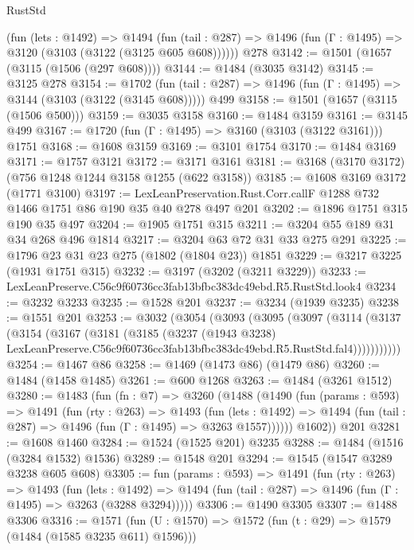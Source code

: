 \begin{lexlean}{RustStd}
\begin{coremodule}
    (fun (lets : @1492) =>
    @1494 (fun (tail : @287) => @1496 (fun (Γ : @1495) => @3120 (@3103 (@3122 (@3125 @605 @608))))))
    @278
@3142 := @1501 (@1657 (@3115 (@1506 (@297 @608))))
@3144 := @1484 (@3035 @3142)
@3145 := @3125 @278
@3154 := @1702
    (fun (tail : @287) => @1496 (fun (Γ : @1495) => @3144 (@3103 (@3122 (@3145 @608)))))
    @499
@3158 := @1501 (@1657 (@3115 (@1506 @500)))
@3159 := @3035 @3158
@3160 := @1484 @3159
@3161 := @3145 @499
@3167 := @1720 (fun (Γ : @1495) => @3160 (@3103 (@3122 @3161))) @1751
@3168 := @1608 @3159
@3169 := @3101 @1754
@3170 := @1484 @3169
@3171 := @1757 @3121
@3172 := @3171 @3161
@3181 := @3168 (@3170 @3172) (@756 @1248 @1244 @3158 @1255 (@622 @3158))
@3185 := @1608 @3169 @3172 (@1771 @3100)
@3197 := LexLeanPreservation.Rust.Corr.callF @1288 @732 @1466 @1751 @86 @190 @35 @40 @278 @497 @201
@3202 := @1896 @1751 @315 @190 @35 @497
@3204 := @1905 @1751 @315
@3211 := @3204 @55 @189 @31 @34 @268 @496 @1814
@3217 := @3204 @63 @72 @31 @33 @275 @291
@3225 := @1796 @23 @31 @23 @275 (@1802 (@1804 @23)) @1851
@3229 := @3217 @3225 (@1931 @1751 @315)
@3232 := @3197 (@3202 (@3211 @3229))
@3233 := LexLeanPreserve.C56c9f60736cc3fab13bfbc383dc49ebd.R5.RustStd.look4
@3234 := @3232 @3233
@3235 := @1528 @201
@3237 := @3234 (@1939 @3235)
@3238 := @1551 @201
@3253 := @3032
    (@3054
      (@3093
        (@3095
          (@3097
            (@3114
              (@3137
                (@3154
                  (@3167
                    (@3181
                      (@3185
                        (@3237
                          (@1943 @3238)
                          LexLeanPreserve.C56c9f60736cc3fab13bfbc383dc49ebd.R5.RustStd.fal4)))))))))))
@3254 := @1467 @86
@3258 := @1469 (@1473 @86) (@1479 @86)
@3260 := @1484 (@1458 @1485)
@3261 := @600 @1268
@3263 := @1484 (@3261 @1512)
@3280 := @1483
    (fun (fn : @7) =>
    @3260
      (@1488
        (@1490
          (fun (params : @593) =>
          @1491
            (fun (rty : @263) =>
            @1493
              (fun (lets : @1492) =>
              @1494 (fun (tail : @287) => @1496 (fun (Γ : @1495) => @3263 @1557))))))
        @1602))
    @201
@3281 := @1608 @1460
@3284 := @1524 (@1525 @201) @3235
@3288 := @1484 (@1516 (@3284 @1532) @1536)
@3289 := @1548 @201
@3294 := @1545 (@1547 @3289 @3238 @605 @608)
@3305 := fun (params : @593) =>
  @1491
    (fun (rty : @263) =>
    @1493
      (fun (lets : @1492) =>
      @1494 (fun (tail : @287) => @1496 (fun (Γ : @1495) => @3263 (@3288 @3294)))))
@3306 := @1490 @3305
@3307 := @1488 @3306
@3316 := @1571 (fun (U : @1570) => @1572 (fun (t : @29) => @1579 (@1484 (@1585 @3235 @611) @1596)))

\end{coremodule}
\end{lexlean}
